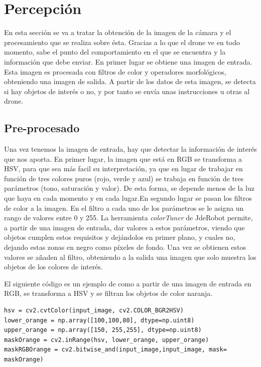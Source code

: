 \section{Percepci\'on}

\hspace{1 cm} En esta secci\'on se va a tratar la obtenci\'on de la imagen de la c\'amara y el procesamiento que se realiza sobre \'esta. Gracias a lo que el drone ve en todo momento, sabe el punto del comportamiento en el que se encuentra y la informaci\'on que debe enviar. En primer lugar se obtiene una imagen de entrada. Esta imagen es procesada con filtros de color y operadores morfol\'ogicos, obteniendo una imagen de salida. A partir de los datos de esta imagen, se detecta si hay objetos de inter\'es o no, y por tanto se env\'ia unas instrucciones u otras al drone. 


\subsection{Pre-procesado}

\hspace{1 cm} Una vez tenemos la imagen de entrada, hay que detectar la informaci\'on de inter\'es que nos aporta.  En primer lugar, la imagen que est\'a en RGB se transforma a HSV, para que sea m\'as facil su interpretaci\'on, ya que en lugar de trabajar en funci\'on de tres colores puros (rojo, verde y azul) se trabaja en funci\'on de tres par\'ametros (tono, saturaci\'on y valor). De esta forma, se depende menos de la luz que haya en cada momento y en cada lugar.En segundo lugar se pasan los filtros de color a la imagen. En el filtro a cada uno de los par\'ametros se le asigna un rango de valores entre 0 y 255. La herramienta \textit{colorTuner} de JdeRobot permite, a partir de una imagen de entrada, dar valores a estos par\'ametros, viendo que objetos cumplen estos requisitos y dej\'andolos en primer plano, y cuales no, dejando estas zonas en negro como p\'ixeles de fondo. Una vez se obtienen estos valores se añaden al filtro, obteniendo a la salida una imagen que solo muestra los objetos de los colores de inter\'es. 

\hspace{1 cm} El siguiente c\'odigo es un ejemplo de como a partir de una imagen de entrada en RGB, se transforma a HSV y se filtran los objetos de color naranja. 

\begin{lstlisting}[backgroundcolor=\color{yellow}]
hsv = cv2.cvtColor(input_image, cv2.COLOR_BGR2HSV)
lower_orange = np.array([100,100,80], dtype=np.uint8)
upper_orange = np.array([150, 255,255], dtype=np.uint8)
maskOrange = cv2.inRange(hsv, lower_orange, upper_orange)
maskRGBOrange = cv2.bitwise_and(input_image,input_image, mask= maskOrange)
\end{lstlisting}


